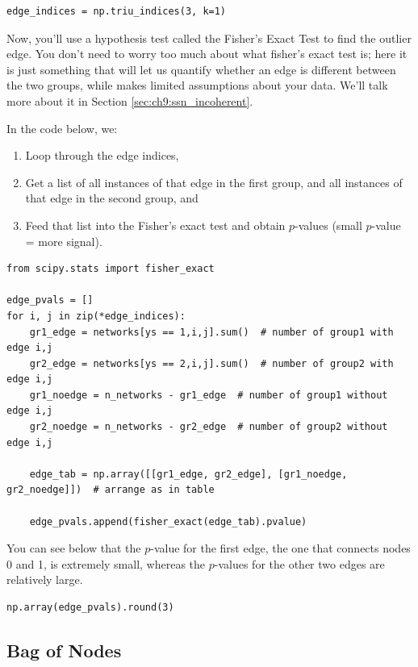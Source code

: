 \begin{lstlisting}[style=python]
edge_indices = np.triu_indices(3, k=1)
\end{lstlisting}

Now, you'll use a hypothesis test called the {Fisher's Exact Test} to find the outlier edge. You don't need to worry too much about what fisher's exact test is; here it is just something that will let us quantify whether an edge is different between the two groups, while makes limited assumptions about your data. We'll talk more about it in Section \ref{sec:ch9:ssn_incoherent}. 

In the code below, we:
\begin{enumerate}
    \item Loop through the edge indices,
    \item Get a list of all instances of that edge in the first group, and all instances of that edge in the second group, and
    \item Feed that list into the Fisher's exact test and obtain $p$-values (small $p$-value = more signal).
\end{enumerate}

\begin{lstlisting}[style=python]
from scipy.stats import fisher_exact

edge_pvals = []
for i, j in zip(*edge_indices):
    gr1_edge = networks[ys == 1,i,j].sum()  # number of group1 with edge i,j
    gr2_edge = networks[ys == 2,i,j].sum()  # number of group2 with edge i,j
    gr1_noedge = n_networks - gr1_edge  # number of group1 without edge i,j
    gr2_noedge = n_networks - gr2_edge  # number of group2 without edge i,j
    
    edge_tab = np.array([[gr1_edge, gr2_edge], [gr1_noedge, gr2_noedge]])  # arrange as in table
    
    edge_pvals.append(fisher_exact(edge_tab).pvalue)
\end{lstlisting}
You can see below that the $p$-value for the first edge, the one that connects nodes 0 and 1, is extremely small, whereas the $p$-values for the other two edges are relatively large.

\begin{lstlisting}[style=python]
np.array(edge_pvals).round(3)
\end{lstlisting}

\subsection{Bag of Nodes}
\label{sec:ch4:net-rep:bagofnodes}

